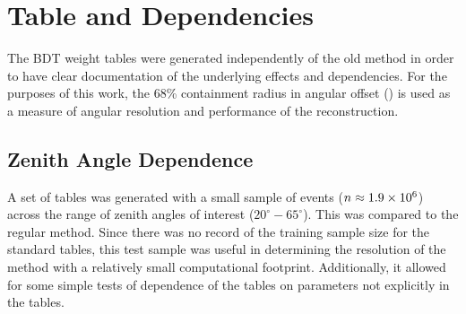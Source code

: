 \documentclass[main.tex]{subfiles}
\begin{document}




\section{\disp Table and \rse Dependencies}
The BDT weight tables were generated independently of the old \disp method in order to have clear documentation of the underlying effects and dependencies. For the purposes of this work, the 68\% containment radius in angular offset (\rse\hspace{-4pt}) is used as a measure of angular resolution and performance of the reconstruction.

\subsection{Zenith Angle Dependence}
A set of \disp tables was generated with a small sample of events ($n\approx 1.9\times 10^{6}$) across the range of zenith angles of interest ($20^\circ-65^\circ$). This was compared to the regular \disp method. Since there was no record of the training sample size for the standard tables, this test sample was useful in determining the resolution of the \disp method with a relatively small computational footprint. Additionally, it allowed for some simple tests of dependence of the \disp tables on parameters not explicitly in the \disp tables.
\end{document}
